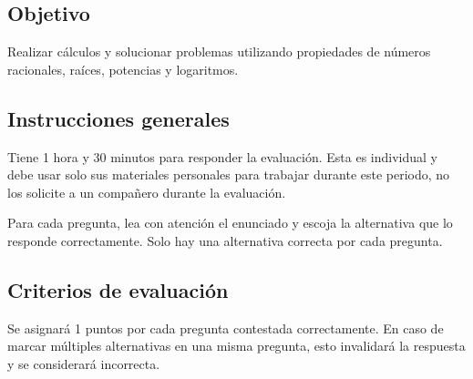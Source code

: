 \documentclass[revolver]{srs}
\begin{document}
\subsection*{Objetivo}
Realizar cálculos y solucionar problemas utilizando propiedades de números racionales,
raíces, potencias y logaritmos.

\subsection*{Instrucciones generales}
Tiene 1 hora y 30 minutos para responder la evaluación. Esta es individual y debe
usar solo sus materiales personales para trabajar durante este periodo, no los solicite
a un compañero durante la evaluación.

Para cada pregunta, lea con atención el enunciado y escoja la alternativa que lo
responde correctamente. Solo hay una alternativa correcta por cada pregunta.

\subsection*{Criterios de evaluación}
Se asignará 1 puntos por cada pregunta contestada correctamente. En caso de marcar múltiples
alternativas en una misma pregunta, esto invalidará la respuesta y se considerará incorrecta.

\separador[2mm]
\end{document}

